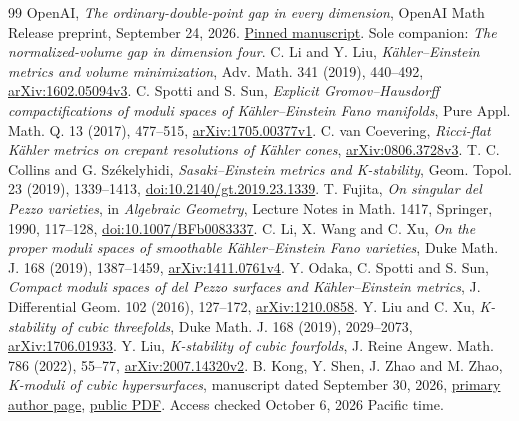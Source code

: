\documentclass[11pt]{article}
\begin{document}
\begin{thebibliography}{99}
 OpenAI, \emph{The ordinary-double-point gap in every dimension},
OpenAI Math Release preprint, September 24, 2026.
\href{https://github.com/openai/math/blob/adc7f1241b42e322a6451854ab7e4b4c146bf78a/preprints/The-ordinary-double-point-gap-in-every-dimension-September-24-2026/paper.pdf}{Pinned manuscript}.
Sole companion: \emph{The normalized-volume gap in dimension four}.
 C. Li and Y. Liu, \emph{K\"ahler--Einstein metrics and volume
minimization}, Adv. Math. 341 (2019), 440--492,
\href{https://arxiv.org/abs/1602.05094}{arXiv:1602.05094v3}.
 C. Spotti and S. Sun, \emph{Explicit Gromov--Hausdorff
compactifications of moduli spaces of K\"ahler--Einstein Fano manifolds},
Pure Appl. Math. Q. 13 (2017), 477--515,
\href{https://arxiv.org/abs/1705.00377}{arXiv:1705.00377v1}.
 C. van Coevering, \emph{Ricci-flat K\"ahler metrics on
crepant resolutions of K\"ahler cones},
\href{https://arxiv.org/abs/0806.3728}{arXiv:0806.3728v3}.
 T. C. Collins and G. Sz\'ekelyhidi, \emph{Sasaki--Einstein
metrics and K-stability}, Geom. Topol. 23 (2019), 1339--1413,
\href{https://doi.org/10.2140/gt.2019.23.1339}{doi:10.2140/gt.2019.23.1339}.
 T. Fujita, \emph{On singular del Pezzo varieties}, in
\emph{Algebraic Geometry}, Lecture Notes in Math. 1417,
Springer, 1990, 117--128,
\href{https://doi.org/10.1007/BFb0083337}{doi:10.1007/BFb0083337}.
 C. Li, X. Wang and C. Xu, \emph{On the proper moduli spaces
of smoothable K\"ahler--Einstein Fano varieties}, Duke Math. J. 168 (2019),
1387--1459, \href{https://arxiv.org/abs/1411.0761}{arXiv:1411.0761v4}.
 Y. Odaka, C. Spotti and S. Sun, \emph{Compact moduli spaces
of del Pezzo surfaces and K\"ahler--Einstein metrics}, J. Differential Geom.
102 (2016), 127--172, \href{https://arxiv.org/abs/1210.0858}{arXiv:1210.0858}.
 Y. Liu and C. Xu, \emph{K-stability of cubic threefolds},
Duke Math. J. 168 (2019), 2029--2073,
\href{https://arxiv.org/abs/1706.01933}{arXiv:1706.01933}.
 Y. Liu, \emph{K-stability of cubic fourfolds},
J. Reine Angew. Math. 786 (2022), 55--77,
\href{https://arxiv.org/abs/2007.14320}{arXiv:2007.14320v2}.
 B. Kong, Y. Shen, J. Zhao and M. Zhao,
\emph{K-moduli of cubic hypersurfaces}, manuscript dated September 30, 2026,
\href{https://sites.google.com/uic.edu/jzhao/research}{primary author page},
\href{https://drive.google.com/file/d/1eB16wLGE2G5QrbV-pUDmw_ieLMiLlOcO/view}{public PDF}.
Access checked October 6, 2026 Pacific time.

\end{thebibliography}
\end{document}
